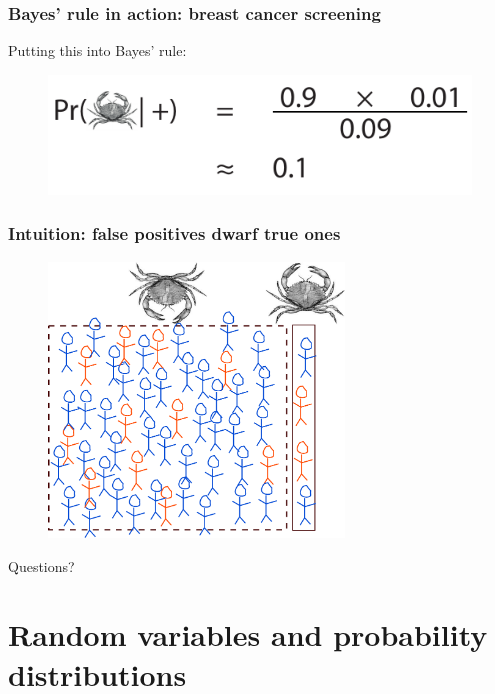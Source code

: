 \documentclass{beamer}
\begin{document}
	\begin{frame}
		\frametitle{Bayes' rule in action: breast cancer screening}
		Putting this into Bayes' rule:
		
		\begin{figure}[ht]
			\includegraphics[width=1\textwidth]{./figures/lec1_cancer4.pdf}
		\end{figure}
		
	\end{frame}

	\begin{frame}
		\frametitle{Intuition: false positives dwarf true ones}
		
		\begin{figure}[ht]
			\includegraphics[width=0.7\textwidth]{./figures/breast_cancer_intuition.pdf}
		\end{figure}
		
		
	\end{frame}
	
	\begin{frame}
		\Large Questions?
	\end{frame}
	

	\section{Random variables and probability distributions}
	\frame{\tableofcontents[currentsection]}
	
\end{document}
